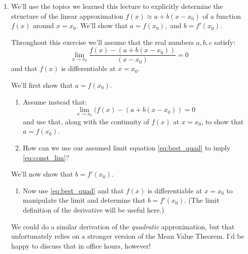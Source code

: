 \documentclass[12pt]{exam}
\begin{document}
\begin{enumerate}
\begin{enumerate}
\item Determine the value of $b$ that makes the function
$$h(x)=\begin{cases} b-x &\text{if $x<5$}\\[3pt] -x^2+6x-6 &\text{if $x\geq 5$}\end{cases}$$
continuous at $x=5$. Clearly explain how you got your answer. 

\vfill

\end{enumerate}
\newpage

\item We'll use the topics we learned this lecture to explicitly determine the structure of the linear approximation $f(x) \approx a + b(x - x_0) $ of a function $f(x)$ around $x = x_0$. We'll show that $a = f(x_0),$ and $ b=f'(x_0)$.

  Throughout this exercise we'll assume that the real numbers $a,b,c$ satisfy:
  \begin{equation}
    \label{eq:best_quad}
    \lim_{x \rightarrow x_0} \dfrac{f(x) - (a + b(x-x_0) )}{(x - x_0)} = 0
  \end{equation}
  and that $f(x)$ is differentiable at $x = x_0$.

  We'll first show that $a = f(x_0)$.
  \begin{enumerate}
    \item Assume instead that:
      \begin{equation}
        \label{eq:const_lim}
        \lim_{x \rightarrow x_0} (f(x) - (a + b(x - x_0) ) = 0
      \end{equation}
      and use that, along with the continuity of $f(x)$ at $x = x_0$,
      to show that $a = f(x_0)$.
      \vfill
    \item How can we use our assumed limit equation \autoref{eq:best_quad}
      to imply \autoref{eq:const_lim}?
      \vfill
  \end{enumerate}
  \newpage

  We'll now show that $b = f'(x_0)$.
  \begin{enumerate}
    \item Now use \autoref{eq:best_quad} 
      and that $f(x)$ is differentiable at $x = x_0$ to manipulate the limit and determine that $b = f'(x_0)$. (The limit definition of the derivative will be useful here.)
      \vfill
  \end{enumerate}
  
  We could do a similar derivation of the \textit{quadratic} approximation,
  but that unfortunately relies on a stronger version of the Mean Value Theorem. I'd be happy to discuss that in office hours, however!


\end{enumerate}



\end{document}
